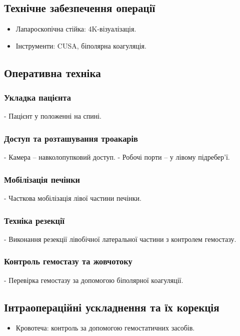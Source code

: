 \begin{refsection}
\subsection{Технічне забезпечення операції}
\begin{itemize}
    \item Лапароскопічна стійка: 4K-візуалізація.
    \item Інструменти: CUSA, біполярна коагуляція.
\end{itemize}

\subsection{Оперативна техніка}
\subsubsection{Укладка пацієнта}
- Пацієнт у положенні на спині.

\subsubsection{Доступ та розташування троакарів}
- Камера – навколопупковий доступ.
- Робочі порти – у лівому підребер'ї.

\subsubsection{Мобілізація печінки}
- Часткова мобілізація лівої частини печінки.

\subsubsection{Техніка резекції}
- Виконання резекції лівобічної латеральної частини з контролем гемостазу.

\subsubsection{Контроль гемостазу та жовчотоку}
- Перевірка гемостазу за допомогою біполярної коагуляції.

\subsection{Інтраопераційні ускладнення та їх корекція}
\begin{itemize}
    \item Кровотеча: контроль за допомогою гемостатичних засобів.
\end{itemize}


\end{refsection}
